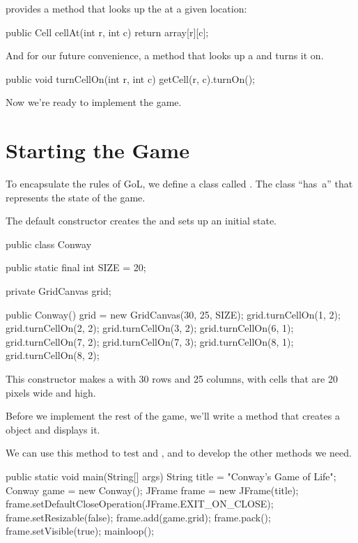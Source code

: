  provides a method that looks up the  at a given location:

\begin{code}
public Cell cellAt(int r, int c) {
    return array[r][c];
}
\end{code}

And for our future convenience, a method that looks up a  and turns it on.

\begin{code}
public void turnCellOn(int r, int c) {
    getCell(r, c).turnOn();
}
\end{code}

Now we're ready to implement the game.

\section{Starting the Game}
\label{conwaymain}

To encapsulate the rules of GoL, we define a class called .
The  class ``has~a''  that represents the state of the game.

The default constructor creates the  and sets up an initial state.

\begin{code}
public class Conway {
    public static final int SIZE = 20;

    private GridCanvas grid;

    public Conway() {
        grid = new GridCanvas(30, 25, SIZE);
        grid.turnCellOn(1, 2);
        grid.turnCellOn(2, 2);
        grid.turnCellOn(3, 2);
        grid.turnCellOn(6, 1);
        grid.turnCellOn(7, 2);
        grid.turnCellOn(7, 3);
        grid.turnCellOn(8, 1);
        grid.turnCellOn(8, 2);
    }
}
\end{code}

This constructor makes a  with 30 rows and 25 columns, with cells that are 20 pixels wide and high.


Before we implement the rest of the game, we'll write a  method that creates a  object and displays it.

We can use this method to test  and , and to develop the other methods we need.

\begin{code}
public static void main(String[] args) {
    String title = "Conway's Game of Life";
    Conway game = new Conway();
    JFrame frame = new JFrame(title);
    frame.setDefaultCloseOperation(JFrame.EXIT_ON_CLOSE);
    frame.setResizable(false);
    frame.add(game.grid);
    frame.pack();
    frame.setVisible(true);
    mainloop();
}
\end{code}

